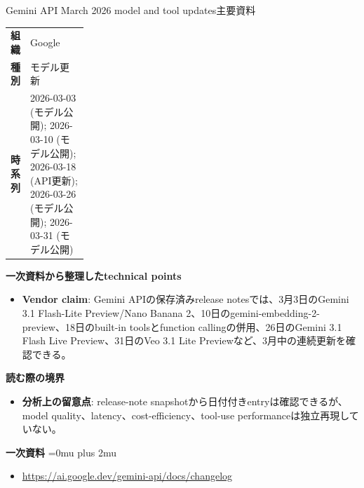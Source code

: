 \begin{technicalnote}{Gemini API March 2026 model and tool updates}{主要資料}
\begingroup
\begin{tabularx}{\linewidth}{@{}>{\bfseries}p{0.22\linewidth}X@{}}
組織 & Google \\
種別 & モデル更新 \\
時系列 & 2026-03-03 (モデル公開); 2026-03-10 (モデル公開); 2026-03-18 (API更新); 2026-03-26 (モデル公開); 2026-03-31 (モデル公開) \\
\end{tabularx}
\smallskip
{\bfseries 一次資料から整理したtechnical points}
\begin{itemize}[leftmargin=1.5em,itemsep=0.35em]
\item \textbf{Vendor claim}: Gemini APIの保存済みrelease notesでは、3月3日のGemini 3.1 Flash-Lite Preview/Nano Banana 2、10日のgemini-embedding-2-preview、18日のbuilt-in toolsとfunction callingの併用、26日のGemini 3.1 Flash Live Preview、31日のVeo 3.1 Lite Previewなど、3月中の連続更新を確認できる。
\end{itemize}
\begin{minipage}{\linewidth}
{\bfseries 読む際の境界}
\begin{itemize}[leftmargin=1.5em,itemsep=0.35em]
\item \textbf{分析上の留意点}: release-note snapshotから日付付きentryは確認できるが、model quality、latency、cost-efficiency、tool-use performanceは独立再現していない。
\end{itemize}
\begin{samepage}
{\bfseries 一次資料}
\begingroup\sloppy
\Urlmuskip=0mu plus 2mu\relax
\begin{itemize}[leftmargin=1.5em,itemsep=0.25em]
\item {\scriptsize\url{https://ai.google.dev/gemini-api/docs/changelog}}
\end{itemize}
\endgroup
\end{samepage}
\end{minipage}
\endgroup
\end{technicalnote}
\medskip

